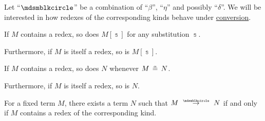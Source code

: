 \begin{proposition}\label{thm:beta_eta_redexes}
  Let \enquote{\( {\Anon} \)} be a combination of \enquote{\( \beta \)}, \enquote{\( \eta \)} and possibly \enquote{\( \delta \)}. We will be interested in how redexes of the corresponding kinds behave under \hyperref[con:lambda_conversion]{conversion}.

  \begin{thmenum}
     If \( M \) contains a redex, so does \( M[\Bbbs] \) for any substitution \( \Bbbs \).

    Furthermore, if \( M \) is itself a redex, so is \( M[\Bbbs] \).

     If \( M \) contains a redex, so does \( N \) whenever \( M \aequiv N \).

    Furthermore, if \( M \) is itself a redex, so is \( N \).

     For a fixed term \( M \), there exists a term \( N \) such that \( M \pred N \) if and only if \( M \) contains a redex of the corresponding kind.
  \end{thmenum}
\end{proposition}
